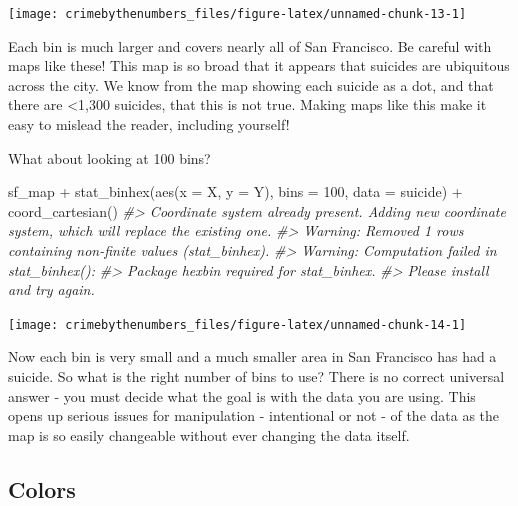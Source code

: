 \documentclass[
  12pt,
]{book}
\newenvironment{Shaded}{\begin{snugshade}}{\end{snugshade}}
\newcommand{\AttributeTok}[1]{\textcolor[rgb]{0.61,0.61,0.61}{#1}}
\newcommand{\CommentTok}[1]{\textcolor[rgb]{0.37,0.37,0.37}{\textit{#1}}}
\newcommand{\DecValTok}[1]{\textcolor[rgb]{0.06,0.06,0.06}{#1}}
\newcommand{\FunctionTok}[1]{\textcolor[rgb]{0,0,0}{#1}}
\newcommand{\NormalTok}[1]{#1}
\newcommand{\SpecialCharTok}[1]{\textcolor[rgb]{0,0,0}{#1}}
\begin{document}
\begin{center}\texttt{[image: crimebythenumbers\_files/figure-latex/unnamed-chunk-13-1]} \end{center}

Each bin is much larger and covers nearly all of San Francisco. Be careful with maps like these! This map is so broad that it appears that suicides are ubiquitous across the city. We know from the map showing each suicide as a dot, and that there are \textless1,300 suicides, that this is not true. Making maps like this make it easy to mislead the reader, including yourself!

What about looking at 100 bins?

\begin{Shaded}
\begin{Highlighting}[]
\NormalTok{sf\_map }\SpecialCharTok{+}
  \FunctionTok{stat\_binhex}\NormalTok{(}\FunctionTok{aes}\NormalTok{(}\AttributeTok{x =}\NormalTok{ X, }\AttributeTok{y =}\NormalTok{ Y),}
              \AttributeTok{bins =} \DecValTok{100}\NormalTok{,}
              \AttributeTok{data =}\NormalTok{ suicide) }\SpecialCharTok{+}
  \FunctionTok{coord\_cartesian}\NormalTok{() }
\CommentTok{\#\textgreater{} Coordinate system already present. Adding new coordinate system, which will replace the existing one.}
\CommentTok{\#\textgreater{} Warning: Removed 1 rows containing non{-}finite values (stat\_binhex).}
\CommentTok{\#\textgreater{} Warning: Computation failed in \textasciigrave{}stat\_binhex()\textasciigrave{}:}
\CommentTok{\#\textgreater{}   Package \textasciigrave{}hexbin\textasciigrave{} required for \textasciigrave{}stat\_binhex\textasciigrave{}.}
\CommentTok{\#\textgreater{}   Please install and try again.}
\end{Highlighting}
\end{Shaded}

\begin{center}\texttt{[image: crimebythenumbers\_files/figure-latex/unnamed-chunk-14-1]} \end{center}

Now each bin is very small and a much smaller area in San Francisco has had a suicide. So what is the right number of bins to use? There is no correct universal answer - you must decide what the goal is with the data you are using. This opens up serious issues for manipulation - intentional or not - of the data as the map is so easily changeable without ever changing the data itself.

\hypertarget{colors}{%
\subsection{Colors}\label{colors}}
\end{document}
